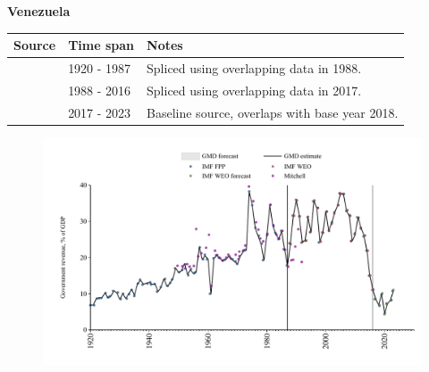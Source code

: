 \documentclass[12pt,a4paper,landscape]{article}
\begin{document}
\begin{adjustbox}{max totalsize={\paperwidth}{\paperheight},center}
\begin{minipage}[t][\textheight][t]{\textwidth}
\vspace*{0.5cm}
{}
\begin{center}
{\Large\bfseries Venezuela}
\end{center}
\vspace{0.5cm}
\begin{table}[H]
\centering
\small
\begin{tabular}{|l|l|l|}
\hline
\textbf{Source} & \textbf{Time span} & \textbf{Notes} \\
\hline
\rowcolor{white}\cite{IMF_FPP}& 1920 - 1987 &Spliced using overlapping data in 1988.\\
\rowcolor{lightgray}\cite{IMF_WEO}& 1988 - 2016 &Spliced using overlapping data in 2017.\\
\rowcolor{white}\cite{IMF_FPP}& 2017 - 2023 &Baseline source, overlaps with base year 2018.\\
\hline
\end{tabular}
\end{table}
\begin{figure}[H]
\centering
\includegraphics[width=\textwidth,height=0.6\textheight,keepaspectratio]{graphs/VEN_govrev_GDP.pdf}
\end{figure}
\end{minipage}
\end{adjustbox}
\end{document}
